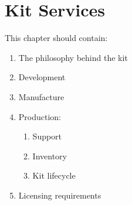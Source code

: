 \section{Kit Services}

This chapter should contain:
\begin{enumerate}
\item The philosophy behind the kit
\item Development
\item Manufacture
\item Production:
  \begin{enumerate}
  \item Support
  \item Inventory
  \item Kit lifecycle
  \end{enumerate}
\item Licensing requirements
\end{enumerate}
